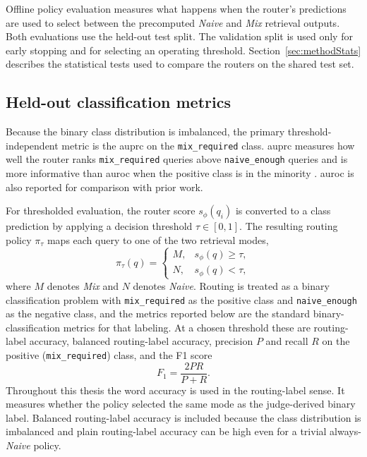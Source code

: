 \documentclass[english, bibtex]{kththesis}               %
\numberwithin{listing}{chapter}
\begin{document}
Offline policy evaluation measures what happens when the router's predictions are used to select between the precomputed \emph{Naive} and \emph{Mix} retrieval outputs. Both evaluations use the held-out test split. The validation split is used only for early stopping and for selecting an operating threshold. Section~\ref{sec:methodStats} describes the statistical tests used to compare the routers on the shared test set.

\subsection{Held-out classification metrics}
\label{sec:methodHeldOut}

Because the binary class distribution is imbalanced, the primary threshold-independent metric is the \gls{auprc} on the \texttt{mix\_required} class. \Gls{auprc} measures how well the router ranks \texttt{mix\_required} queries above \texttt{naive\_enough} queries and is more informative than \gls{auroc} when the positive class is in the minority \cite{saito2015precision}. \Gls{auroc} is also reported for comparison with prior work.

For thresholded evaluation, the router score \(s_\phi(q_i)\) is converted to a class prediction by applying a decision threshold \(\tau \in [0, 1]\). The resulting routing policy \(\pi_\tau\) maps each query to one of the two retrieval modes,
\begin{equation}
\label{eq:routingPolicy}
\pi_\tau(q) =
\begin{cases}
M, & s_\phi(q) \geq \tau,\\
N, & s_\phi(q) < \tau,
\end{cases}
\end{equation}
where \(M\) denotes \emph{Mix} and \(N\) denotes \emph{Naive}. Routing is treated as a binary classification problem with \texttt{mix\_required} as the positive class and \texttt{naive\_enough} as the negative class, and the metrics reported below are the standard binary-classification metrics for that labeling. At a chosen threshold these are routing-label accuracy, balanced routing-label accuracy, precision \(P\) and recall \(R\) on the positive (\texttt{mix\_required}) class, and the F1 score
\begin{equation}
\label{eq:f1}
F_1 = \frac{2 P R}{P + R}.
\end{equation}
Throughout this thesis the word accuracy is used in the routing-label sense. It measures whether the policy selected the same mode as the judge-derived binary label. Balanced routing-label accuracy is included because the class distribution is imbalanced and plain routing-label accuracy can be high even for a trivial always-\emph{Naive} policy.
\end{document}
